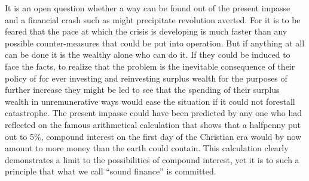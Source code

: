 \documentclass{book}
\begin{document}
It is an open question whether a way can be found out of the present impasse and a financial crash such as might precipitate revolution averted. For it is to be feared that the pace at which the crisis is developing is much faster than any possible counter-measures that could be put into operation. But if anything at all can be done it is the wealthy alone who can do it. If they could be induced to face the facts, to realize that the problem is the inevitable consequence of their policy of for ever investing and reinvesting surplus wealth for the purposes of further increase they might be led to see that the spending of their surplus wealth in unremunerative ways would ease the situation if it could not forestall catastrophe. The present impasse could have been predicted by any one who had reflected on the famous arithmetical calculation that shows that a halfpenny put out to 5\%, compound interest on the first day of the Christian era would by now amount to more money than the earth could contain. This calculation clearly demonstrates a limit to the possibilities of compound interest, yet it is to such a principle that what we call “sound finance” is committed.
\end{document}

